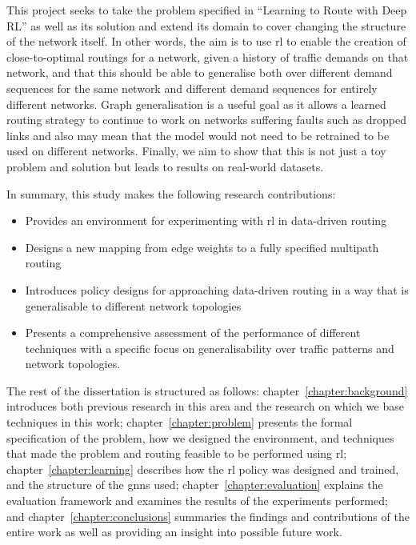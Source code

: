 This project seeks to take the problem specified in ``Learning to Route with Deep RL'' as well as its solution and extend its domain to cover changing the structure of the network itself. In other words, the aim is to use \ac{rl} to enable the creation of close-to-optimal routings for a network, given a history of traffic demands on that network, and that this should be able to generalise both over different demand sequences for the same network and different demand sequences for entirely different networks. Graph generalisation is a useful goal as it allows a learned routing strategy to continue to work on networks suffering faults such as dropped links and also may mean that the model would not need to be retrained to be used on different networks. Finally, we aim to show that this is not just a toy problem and solution but leads to results on real-world datasets.

In summary, this study makes the following research contributions:
\begin{itemize}
  \item Provides an environment for experimenting with \ac{rl} in data-driven routing
  \item Designs a new mapping from edge weights to a fully specified multipath routing
  \item Introduces policy designs for approaching data-driven routing in a way that is generalisable to different network topologies
  \item Presents a comprehensive assessment of the performance of different techniques with a specific focus on generalisability over traffic patterns and network topologies.
\end{itemize}

The rest of the dissertation is structured as follows: chapter~\ref{chapter:background} introduces both previous research in this area and the research on which we base techniques in this work; chapter~\ref{chapter:problem} presents the formal specification of the problem, how we designed the environment, and techniques that made the problem and routing feasible to be performed using \ac{rl}; chapter~\ref{chapter:learning} describes how the \ac{rl} policy was designed and trained, and the structure of the \acp{gnn} used; chapter~\ref{chapter:evaluation} explains the evaluation framework and examines the results of the experiments performed; and chapter~\ref{chapter:conclusions} summaries the findings and contributions of the entire work as well as providing an insight into possible future work.
